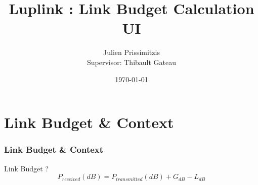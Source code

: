 \documentclass{beamer}
\title{Luplink : Link Budget Calculation UI}
\subtitle{}
\author{Julien Prissimitzis\\
\bigskip
Supervisor: Thibault Gateau}
\institute{DCAS ISAE-Supaero}
\date{\today}
\begin{document}


\begin{frame}
	\titlepage
\end{frame}

\section{Link Budget \& Context}

\begin{frame}
	\frametitle{Link Budget \& Context}


	\begin{alertblock}{Link Budget ?}
	  $$P_{received}(dB) = P_{transmitted}(dB) + G_{dB} - L_{dB}$$
	\end{alertblock}



\end{frame}
\end{document}
